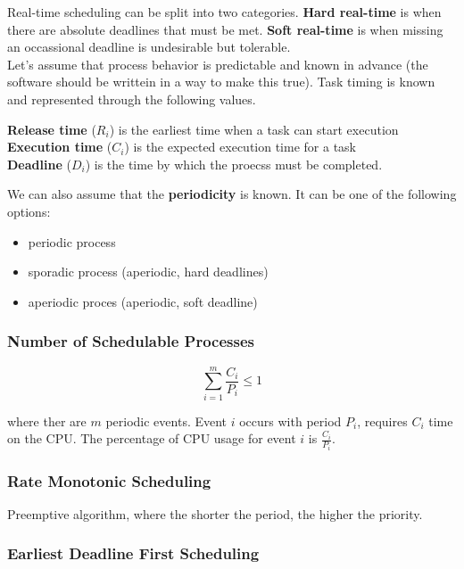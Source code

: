 \documentclass{article}
\newcommand{\bold}[1]{\textbf{#1}}
\renewcommand{\b}{\item[$\circ$]}
\newcommand{\newlist}{\begin{itemize}}
\renewcommand{\endlist}{\end{itemize}}
\begin{document}
    \noindent Real-time scheduling can be split into two categories. \bold{Hard real-time} is when there are absolute deadlines that must be met. \bold{Soft real-time} is when missing an occassional deadline is undesirable but tolerable. \\ 

    \noindent Let's assume that process behavior is predictable and known in advance (the software should be writtein in a way to make this true). Task timing is known and represented through the following values. 
    
    \begin{center}
        \bold{Release time} ($R_i$) is the earliest time when a task can start execution \\
        \bold{Execution time} ($C_i$) is the expected execution time for a task \\ 
        \bold{Deadline} ($D_i$) is the time by which the proecss must be completed. 
    \end{center}

    \noindent We can also assume that the \bold{periodicity} is known. It can be one of the following options:

    \newlist
    \b periodic process
    \b sporadic process (aperiodic, hard deadlines)
    \b aperiodic proces (aperiodic, soft deadline)
    \endlist

    \subsubsection{Number of Schedulable Processes}

    $$\sum_{i=1}^{m} \frac{C_i}{P_i} \leq 1$$

    \noindent where ther are $m$ periodic events. Event $i$ occurs with period $P_i$, requires $C_i$ time on the CPU. The percentage of CPU usage for event $i$ is $\frac{C_i}{P_i}$. 

    \subsubsection{Rate Monotonic Scheduling}

    Preemptive algorithm, where the shorter the period, the higher the priority.

    \subsubsection{Earliest Deadline First Scheduling}
\end{document}
